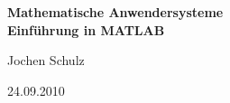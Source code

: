 \usepackage{amssymb}
\usepackage{amsmath}
\usepackage[svgnames]{xcolor} %




\parindent0cm %



\newenvironment{aufg}[1]
{\begin{samepage}%
{\large\textbf{Aufgabe \arabic{zaehler} }\hfill #1 Punkte}\\[0.4cm]
\begin{minipage}{\textwidth}
}
{\end{minipage} \nopagebreak %
\stepcounter{zaehler}                           %
\end{samepage}%
\bigskip
}



\begin{center}
\textbf{\LARGE Mathematische Anwendersysteme }\\
\textbf{\LARGE Einführung in MATLAB}\\\medskip
\end{center}
\begin{minipage}{6cm}
Jochen Schulz
\end{minipage}\hfill
\begin{minipage}{4cm}
24.09.2010
\end{minipage}\\[1cm]

